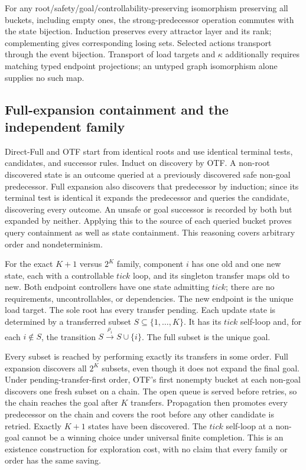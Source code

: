 \documentclass[11pt]{article}
\begin{document}
For any root/safety/goal/controllability-preserving isomorphism preserving all buckets, including empty ones, the strong-predecessor operation commutes with the state bijection. Induction preserves every attractor layer and its rank; complementing gives corresponding losing sets. Selected actions transport through the event bijection. Transport of load targets and $\kappa$ additionally requires matching typed endpoint projections; an untyped graph isomorphism alone supplies no such map.

\subsection{Full-expansion containment and the independent family}
Direct-Full and OTF start from identical roots and use identical terminal tests, candidates, and successor rules. Induct on discovery by OTF. A non-root discovered state is an outcome queried at a previously discovered safe non-goal predecessor. Full expansion also discovers that predecessor by induction; since its terminal test is identical it expands the predecessor and queries the candidate, discovering every outcome. An unsafe or goal successor is recorded by both but expanded by neither. Applying this to the source of each queried bucket proves query containment as well as state containment. This reasoning covers arbitrary order and nondeterminism.

For the exact $K+1$ versus $2^K$ family, component $i$ has one old and one new state, each with a controllable $tick$ loop, and its singleton transfer maps old to new. Both endpoint controllers have one state admitting $tick$; there are no requirements, uncontrollables, or dependencies. The new endpoint is the unique load target. The sole root has every transfer pending. Each update state is determined by a transferred subset $S\subseteq\{1,\ldots,K\}$. It has its $tick$ self-loop and, for each $i\notin S$, the transition $S\xrightarrow{\rho_i}S\cup\{i\}$. The full subset is the unique goal.

Every subset is reached by performing exactly its transfers in some order. Full expansion discovers all $2^K$ subsets, even though it does not expand the final goal. Under pending-transfer-first order, OTF's first nonempty bucket at each non-goal discovers one fresh subset on a chain. The open queue is served before retries, so the chain reaches the goal after $K$ transfers. Propagation then promotes every predecessor on the chain and covers the root before any other candidate is retried. Exactly $K+1$ states have been discovered. The $tick$ self-loop at a non-goal cannot be a winning choice under universal finite completion. This is an existence construction for exploration cost, with no claim that every family or order has the same saving.
\end{document}
